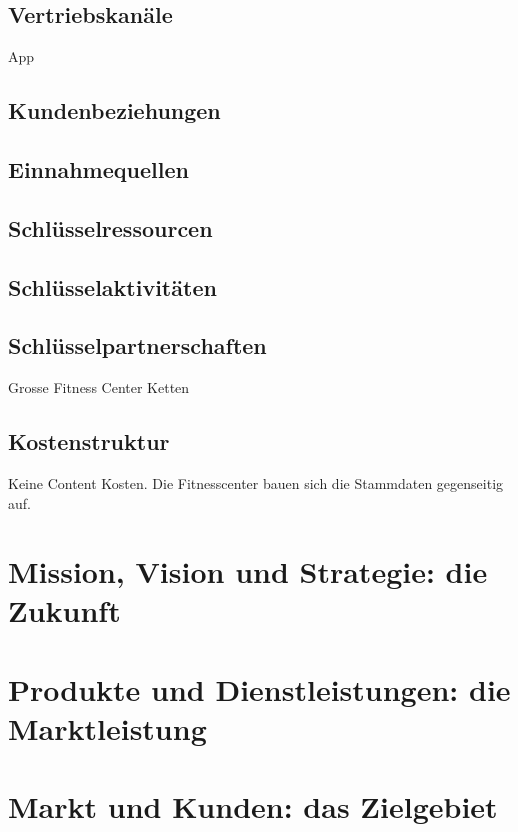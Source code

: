 \subsection{Vertriebskanäle}
App

\subsection{Kundenbeziehungen}

\subsection{Einnahmequellen}

\subsection{Schlüsselressourcen}

\subsection{Schlüsselaktivitäten}


\subsection{Schlüsselpartnerschaften}
Grosse Fitness Center Ketten

\subsection{Kostenstruktur}
Keine Content Kosten. Die Fitnesscenter bauen sich die Stammdaten gegenseitig auf. 

% 




\section{Mission, Vision und Strategie: die Zukunft}

\section{Produkte und Dienstleistungen: die Marktleistung}

\section{Markt und Kunden: das Zielgebiet}

